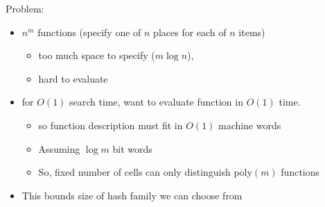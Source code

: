 \documentclass[12pt]{article}
\begin{document}
Problem: 
\begin{itemize}
\item $n^m$ functions (specify one of $n$ places for each of $n$
  items)
\begin{itemize}
\item too much space to specify ($m\log n$), 
\item hard to evaluate
\end{itemize}
\item for $O(1)$ search time, want to evaluate function in
  $O(1)$ time.  
\begin{itemize}
\item so function description must fit in $O(1)$ machine words
\item Assuming $\log m$ bit words
\item So, fixed number of cells can only distinguish poly$(m)$
  functions
\end{itemize}
\item This bounds size of hash family we can choose from
\end{itemize}
\end{document}
